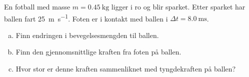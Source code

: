 %
En fotball med masse $m = \SI{0.45}{\kilo\gram}$ ligger i ro og blir sparket. Etter sparket har ballen fart \SI{25}{\metre\per\second}. Foten er i kontakt med ballen i $\Delta t = \SI{8.0}{\milli\second}$.
\begin{enumerate}[a)]
    \item Finn endringen i bevegelsesmengden til ballen.
    \item Finn den gjennomsnittlige kraften fra foten på ballen.
    \item Hvor stor er denne kraften sammenliknet med tyngdekraften på ballen?
\end{enumerate}
